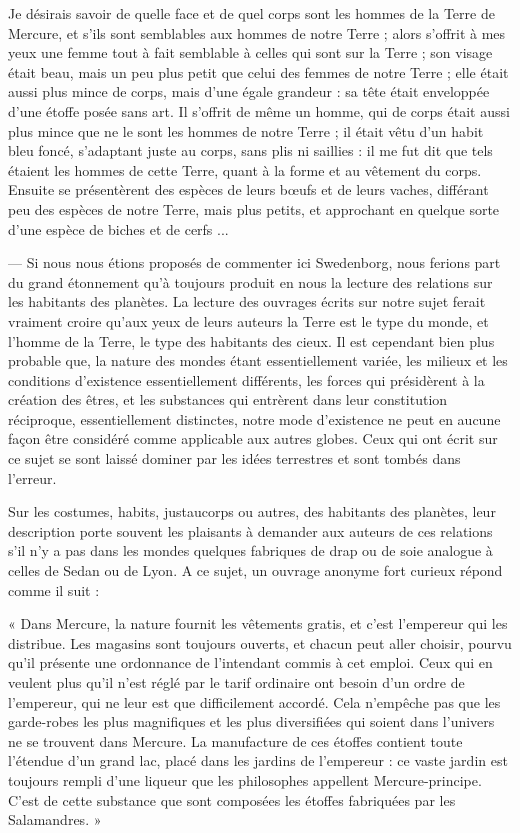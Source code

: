 \documentclass[a4paper, 11pt, oneside, landscape]{article}
\begin{document}
Je désirais savoir de quelle face et de quel corps sont les hommes de la Terre de Mercure, et s'ils sont semblables aux hommes de notre Terre ; alors s'offrit à mes yeux une femme tout à fait semblable à celles qui sont sur la Terre ; son visage était beau, mais un peu plus petit que celui des femmes de notre Terre ; elle était aussi plus mince de corps, mais d'une égale grandeur : sa tête était enveloppée d'une étoffe posée sans art. Il s'offrit de même un homme, qui de corps était aussi plus mince que ne le sont les hommes de notre Terre ; il était vêtu d'un habit bleu foncé, s'adaptant juste au corps, sans plis ni saillies : il me fut dit que tels étaient les hommes de cette Terre, quant à la forme et au vêtement du corps. Ensuite se présentèrent des espèces de leurs bœufs et de leurs vaches, différant peu des espèces de notre Terre, mais plus petits, et approchant en quelque sorte d'une espèce de biches et de cerfs ...

--- Si nous nous étions proposés de commenter ici Swedenborg, nous ferions part du grand étonnement qu'à toujours produit en nous la lecture des relations sur les habitants des planètes. La lecture des ouvrages écrits sur notre sujet ferait vraiment croire qu'aux yeux de leurs auteurs la Terre est le type du monde, et l'homme de la Terre, le type des habitants des cieux. Il est cependant bien plus probable que, la nature des mondes étant essentiellement variée, les milieux et les conditions d'existence essentiellement différents, les forces qui présidèrent à la création des êtres, et les substances qui entrèrent dans leur constitution réciproque, essentiellement distinctes, notre mode d'existence ne peut en aucune façon être considéré comme applicable aux autres globes. Ceux qui ont écrit sur ce sujet se sont laissé dominer par les idées terrestres et sont tombés dans l'erreur.

Sur les costumes, habits, justaucorps ou autres, des habitants des planètes, leur description porte souvent les plaisants à demander aux auteurs de ces relations s'il n'y a pas dans les mondes quelques fabriques de drap ou de soie analogue à celles de Sedan ou de Lyon. A ce sujet, un ouvrage anonyme fort curieux répond comme il suit :

« Dans Mercure, la nature fournit les vêtements gratis, et c'est l'empereur qui les distribue. Les magasins sont toujours ouverts, et chacun peut aller choisir, pourvu qu'il présente une ordonnance de l'intendant commis à cet emploi. Ceux qui en veulent plus qu'il n'est réglé par le tarif ordinaire ont besoin d'un ordre de l'empereur, qui ne leur est que difficilement accordé. Cela n'empêche pas que les garde-robes les plus magnifiques et les plus diversifiées qui soient dans l'univers ne se trouvent dans Mercure. La manufacture de ces étoffes contient toute l'étendue d'un grand lac, placé dans les jardins de l'empereur : ce vaste jardin est toujours rempli d'une liqueur que les philosophes appellent Mercure-principe. C'est de cette substance que sont composées les étoffes fabriquées par les Salamandres. »
\end{document}
